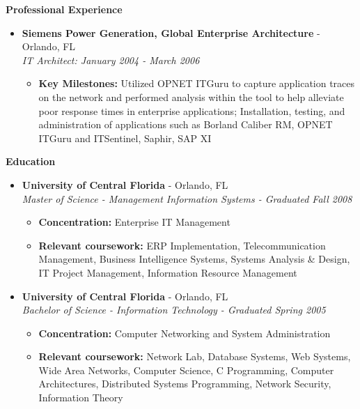 \documentclass[10pt,oneside]{article}
\newenvironment{ressection}[1]{
  \vspace{4pt}
  \textbf{\selectfont\normalsize#1}
  \begin{itemize}
  \vspace{3pt}
}{
  \end{itemize}
}
\newcommand{\ressubitem}[1]{
  \vspace{-1pt}
  \item \begin{flushleft} #1 \end{flushleft}
}
\newcommand{\resbigitem}[3]{
  \vspace{-5pt}
  \item
  \textbf{#1} - #2 \\
  \textit{#3}
}
\newenvironment{ressubsec}[3]{
  \resbigitem{#1}{#2}{#3}
  \vspace{-2pt}
  \begin{itemize}
}{
  \end{itemize}
}
\begin{document}
\begin{ressection}{Professional Experience}
\begin{ressubsec}{Siemens Power Generation, Global Enterprise Architecture}{Orlando, FL}{IT Architect: January 2004 - March 2006}
    \ressubitem{\textbf{Key Milestones:} Utilized OPNET ITGuru to capture application traces on the network and performed analysis within the tool to help alleviate poor response times in enterprise applications; Installation, testing, and administration of applications such as Borland Caliber RM, OPNET ITGuru and ITSentinel, Saphir, SAP XI}
    
  \end{ressubsec}







\end{ressection}


\begin{ressection}{Education}

  \begin{ressubsec}{University of Central Florida}{Orlando, FL}{Master of Science - Management Information Systems - Graduated Fall 2008}

    \ressubitem{\textbf{Concentration:} Enterprise IT Management}
    
    \ressubitem{\textbf{Relevant coursework:} ERP Implementation, Telecommunication Management, Business Intelligence Systems, Systems Analysis \& Design, IT Project Management, Information Resource Management}

  \end{ressubsec}

  \begin{ressubsec}{University of Central Florida}{Orlando, FL}{Bachelor of Science - Information Technology - Graduated Spring 2005}

    \ressubitem{\textbf{Concentration:} Computer Networking and System Administration}
    
    \ressubitem{\textbf{Relevant coursework:} Network Lab, Database Systems, Web Systems, Wide Area Networks, Computer Science, C Programming, Computer Architectures, Distributed Systems Programming, Network Security, Information Theory}

  \end{ressubsec}

\end{ressection}
\end{document}
